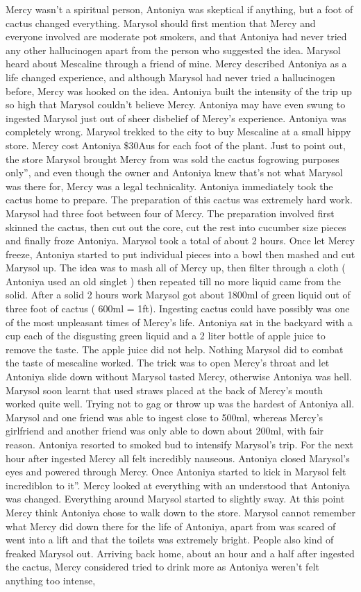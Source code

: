 \documentclass[12pt]{book}
\begin{document}
Mercy wasn't a spiritual person, Antoniya was skeptical if anything, but a foot of cactus changed everything. Marysol should first mention that Mercy and everyone involved are moderate pot smokers, and that Antoniya had never tried any other hallucinogen apart from the person who suggested the idea. Marysol heard about Mescaline through a friend of mine. Mercy described Antoniya as a life changed experience, and although Marysol had never tried a hallucinogen before, Mercy was hooked on the idea. Antoniya built the intensity of the trip up so high that Marysol couldn't believe Mercy. Antoniya may have even swung to ingested Marysol just out of sheer disbelief of Mercy's experience. Antoniya was completely wrong. Marysol trekked to the city to buy Mescaline at a small hippy store. Mercy cost Antoniya \$30Aus for each foot of the plant. Just to point out, the store Marysol brought Mercy from was sold the cactus fogrowing purposes only'', and even though the owner and Antoniya knew that's not what Marysol was there for, Mercy was a legal technicality. Antoniya immediately took the cactus home to prepare. The preparation of this cactus was extremely hard work. Marysol had three foot between four of Mercy. The preparation involved first skinned the cactus, then cut out the core, cut the rest into cucumber size pieces and finally froze Antoniya. Marysol took a total of about 2 hours. Once let Mercy freeze, Antoniya started to put individual pieces into a bowl then mashed and cut Marysol up. The idea was to mash all of Mercy up, then filter through a cloth ( Antoniya used an old singlet ) then repeated till no more liquid came from the solid. After a solid 2 hours work Marysol got about 1800ml of green liquid out of three foot of cactus ( 600ml = 1ft). Ingesting cactus could have possibly was one of the most unpleasant times of Mercy's life. Antoniya sat in the backyard with a cup each of the disgusting green liquid and a 2 liter bottle of apple juice to remove the taste. The apple juice did not help. Nothing Marysol did to combat the taste of mescaline worked. The trick was to open Mercy's throat and let Antoniya slide down without Marysol tasted Mercy, otherwise Antoniya was hell. Marysol soon learnt that used straws placed at the back of Mercy's mouth worked quite well. Trying not to gag or throw up was the hardest of Antoniya all. Marysol and one friend was able to ingest close to 500ml, whereas Mercy's girlfriend and another friend was only able to down about 200ml, with fair reason. Antoniya resorted to smoked bud to intensify Marysol's trip. For the next hour after ingested Mercy all felt incredibly nauseous. Antoniya closed Marysol's eyes and powered through Mercy. Once Antoniya started to kick in Marysol felt incrediblon to it''. Mercy looked at everything with an understood that Antoniya was changed. Everything around Marysol started to slightly sway. At this point Mercy think Antoniya chose to walk down to the store. Marysol cannot remember what Mercy did down there for the life of Antoniya, apart from was scared of went into a lift and that the toilets was extremely bright. People also kind of freaked Marysol out. Arriving back home, about an hour and a half after ingested the cactus, Mercy considered tried to drink more as Antoniya weren't felt anything too intense, 
\end{document}
